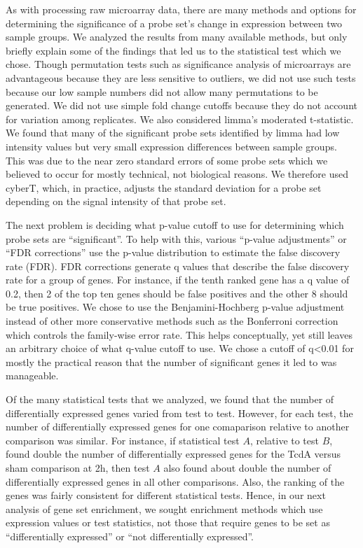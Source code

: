As with processing raw microarray data, there are many methods and options
for determining the significance of a probe set's change in expression between
two sample groups. We analyzed the results from many available methods, but only
briefly explain some of the findings that led us to the statistical test 
which we chose. Though permutation tests such as significance analysis of
microarrays\autocite{Tusher2001} are advantageous because they are less sensitive to outliers,
we did not use such tests because our low sample numbers did not allow
many permutations to be generated. We did not use simple fold change cutoffs because
they do not account for variation among replicates. We also considered limma's 
moderated t-statistic.\autocite{Smyth2004,Smyth2005} We found
that many of the significant probe sets identified by limma had low intensity values but very
small expression differences between sample groups. This was due to the near zero standard 
errors of some probe sets which we believed to occur for mostly technical,
not biological reasons. We therefore used cyberT\autocite{Baldi2001}, which, in practice,
adjusts the standard deviation for a probe set depending on the signal intensity
of that probe set.

The next problem is deciding what p-value cutoff to use for determining which
probe sets are ``significant''. To help with this, various ``p-value adjustments'' or
``FDR corrections'' use the p-value distribution to estimate the false discovery
rate (FDR). FDR corrections generate q values that describe the false discovery
rate for a group of genes. For instance, if the tenth ranked gene has a q value of 0.2, then
2 of the top ten genes should be false positives and the other 8 should be true
positives. We chose to use the Benjamini-Hochberg p-value adjustment\autocite{Benjamini1995}
instead of other more conservative methods such as the Bonferroni correction which
controls the family-wise error rate. This 
helps conceptually, yet still leaves an arbitrary choice of 
what q-value cutoff to use. We chose a cutoff of q\textless{}0.01 for mostly the practical
reason that the number of significant genes it led to was manageable.

Of the many statistical tests that we analyzed, we found that the number of
differentially expressed genes varied from test to test. However, for each test,
the number of differentially expressed genes for one comaparison relative to
another comparison was similar. For instance,
if statistical test $A$, relative to test $B$, found double the number of differentially expressed genes
for the TcdA versus sham comparison at 2h, then test $A$ also found about double the number of
differentially expressed genes in all other comparisons. Also,
the ranking of the genes was fairly consistent for different statistical tests.
Hence, in our next analysis of gene set enrichment, we sought enrichment
methods which use expression values or test statistics, not those that require 
genes to be set as ``differentially expressed'' or ``not differentially expressed''.

